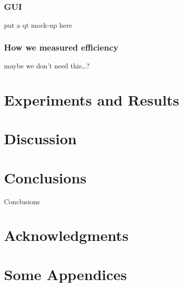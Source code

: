 \documentclass{sig-alternate-05-2015}
\begin{document}
\subsubsection{GUI}
put a qt mock-up here
\subsubsection{How we measured efficiency}
maybe we don't need this\ldots?
\section{Experiments and Results}
\section{Discussion}

\section{Conclusions}
Conclusions

\section{Acknowledgments}

%

%
%
\appendix
\section{Some Appendices}
\end{document}
